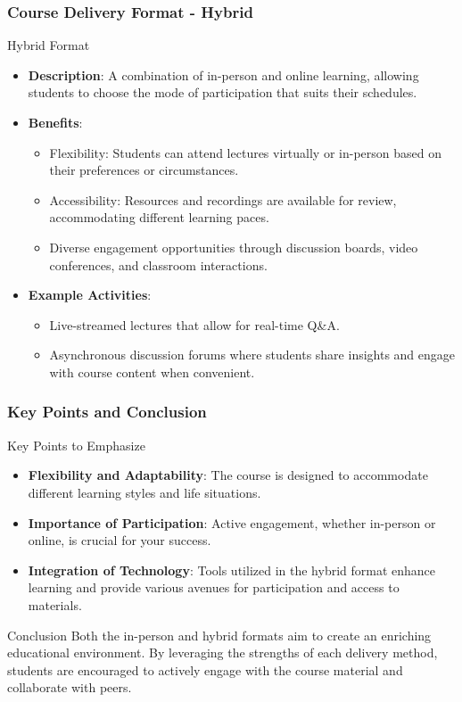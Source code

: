 \documentclass[aspectratio=169]{beamer}
\begin{document}
\begin{frame}[fragile]
    \frametitle{Course Delivery Format - Hybrid}
    \begin{block}{Hybrid Format}
        \begin{itemize}
            \item \textbf{Description}: A combination of in-person and online learning, allowing students to choose the mode of participation that suits their schedules.
            \item \textbf{Benefits}:
            \begin{itemize}
                \item Flexibility: Students can attend lectures virtually or in-person based on their preferences or circumstances.
                \item Accessibility: Resources and recordings are available for review, accommodating different learning paces.
                \item Diverse engagement opportunities through discussion boards, video conferences, and classroom interactions.
            \end{itemize}
            \item \textbf{Example Activities}:
            \begin{itemize}
                \item Live-streamed lectures that allow for real-time Q\&A.
                \item Asynchronous discussion forums where students share insights and engage with course content when convenient.
            \end{itemize}
        \end{itemize}
    \end{block}
\end{frame}

\begin{frame}[fragile]
    \frametitle{Key Points and Conclusion}
    \begin{block}{Key Points to Emphasize}
        \begin{itemize}
            \item \textbf{Flexibility and Adaptability}: The course is designed to accommodate different learning styles and life situations.
            \item \textbf{Importance of Participation}: Active engagement, whether in-person or online, is crucial for your success.
            \item \textbf{Integration of Technology}: Tools utilized in the hybrid format enhance learning and provide various avenues for participation and access to materials.
        \end{itemize}
    \end{block}
    
    \begin{block}{Conclusion}
        Both the in-person and hybrid formats aim to create an enriching educational environment. By leveraging the strengths of each delivery method, students are encouraged to actively engage with the course material and collaborate with peers.
    \end{block}
\end{frame}
\end{document}
